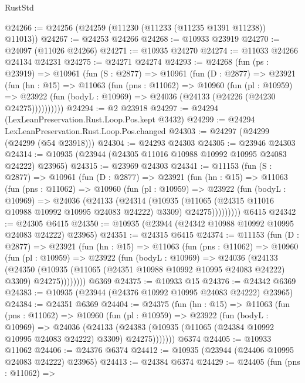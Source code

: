 \begin{lexlean}{RustStd}
\begin{coremodule}
{\begin{coremodule}
{{{{{{{{{{{{{{{{{{{{{{{{{{{{{{{{{{{{{{{{{{{{{{{{{{{{{{{{{{{{{{{{{{{{{{{{{{{{{{{{{{{{{@24266 := @24256 (@24259 (@11230 (@11233 (@11235 @1391 @11238)) @11013))
@24267 := @24253 @24266
@24268 := @10933 @23919
@24270 := @24097 (@11026 @24266)
@24271 := @10935 @24270
@24274 := @11033 @24266 @24134 @24231
@24275 := @24271 @24274
@24293 := @24268
    (fun (ps : @23919) =>
    @10961
      (fun (S : @2877) =>
      @10961
        (fun (D : @2877) =>
        @23921
          (fun (hn : @15) =>
          @11063
            (fun (pns : @11062) =>
            @10960
              (fun (pl : @10959) =>
              @23922 (fun (bodyL : @10969) => @24036 (@24133 (@24226 (@24230 @24275))))))))))
@24294 := @2 @23918
@24297 := @24294 (LexLeanPreservation.Rust.Loop.Pos.kept @3432)
@24299 := @24294 LexLeanPreservation.Rust.Loop.Pos.changed
@24303 := @24297 (@24299 (@24299 (@54 @23918)))
@24304 := @24293 @24303
@24305 := @23946 @24303
@24314 := @10935 (@23944 (@24305 @11016 @10988 @10992 @10995 @24083 @24222) @23965)
@24315 := @23969 @24303
@24341 := @11153
    (fun (S : @2877) =>
    @10961
      (fun (D : @2877) =>
      @23921
        (fun (hn : @15) =>
        @11063
          (fun (pns : @11062) =>
          @10960
            (fun (pl : @10959) =>
            @23922
              (fun (bodyL : @10969) =>
              @24036
                (@24133
                  (@24314
                    (@10935
                      (@11065 (@24315 @11016 @10988 @10992 @10995 @24083 @24222) @3309)
                      @24275)))))))))
    @6415
@24342 := @24305 @6415
@24350 := @10935 (@23944 (@24342 @10988 @10992 @10995 @24083 @24222) @23965)
@24351 := @24315 @6415
@24374 := @11153
    (fun (D : @2877) =>
    @23921
      (fun (hn : @15) =>
      @11063
        (fun (pns : @11062) =>
        @10960
          (fun (pl : @10959) =>
          @23922
            (fun (bodyL : @10969) =>
            @24036
              (@24133
                (@24350
                  (@10935 (@11065 (@24351 @10988 @10992 @10995 @24083 @24222) @3309) @24275))))))))
    @6369
@24375 := @10933 @15
@24376 := @24342 @6369
@24383 := @10935 (@23944 (@24376 @10992 @10995 @24083 @24222) @23965)
@24384 := @24351 @6369
@24404 := @24375
    (fun (hn : @15) =>
    @11063
      (fun (pns : @11062) =>
      @10960
        (fun (pl : @10959) =>
        @23922
          (fun (bodyL : @10969) =>
          @24036
            (@24133
              (@24383 (@10935 (@11065 (@24384 @10992 @10995 @24083 @24222) @3309) @24275)))))))
    @6374
@24405 := @10933 @11062
@24406 := @24376 @6374
@24412 := @10935 (@23944 (@24406 @10995 @24083 @24222) @23965)
@24413 := @24384 @6374
@24429 := @24405
    (fun (pns : @11062) =>
}}}}}}}}}}}}}}}}}}}}}}}}}}}}}}}}}}}}}}}}}}}}}}}}}}}}}}}}}}}}}}}}}}}}}}}}}}}}}}}}}}}}}
\end{coremodule}}
\end{coremodule}
\end{lexlean}
